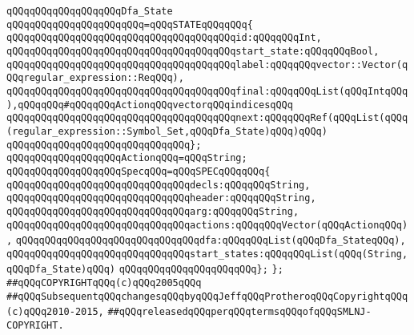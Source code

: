 \verb|qQQqqQQqqQQqqQQqqQQqDfa_State|\newline
\verb|qQQqqQQqqQQqqQQqqQQqqQQq=qQQqSTATEqQQqqQQq{|\newline
\verb|qQQqqQQqqQQqqQQqqQQqqQQqqQQqqQQqqQQqqQQqid:qQQqqQQqInt,|\newline
\verb|qQQqqQQqqQQqqQQqqQQqqQQqqQQqqQQqqQQqqQQqstart_state:qQQqqQQqBool,|\newline
\verb|qQQqqQQqqQQqqQQqqQQqqQQqqQQqqQQqqQQqqQQqlabel:qQQqqQQqvector::Vector(qQQqregular_expression::ReqQQq),|\newline
\verb|qQQqqQQqqQQqqQQqqQQqqQQqqQQqqQQqqQQqqQQqfinal:qQQqqQQqList(qQQqIntqQQq),qQQqqQQq#qQQqqQQqActionqQQqvectorqQQqindicesqQQq|\newline
\verb|qQQqqQQqqQQqqQQqqQQqqQQqqQQqqQQqqQQqqQQqnext:qQQqqQQqRef(qQQqList(qQQq(regular_expression::Symbol_Set,qQQqDfa_State)qQQq)qQQq)|\newline
\verb|qQQqqQQqqQQqqQQqqQQqqQQqqQQqqQQq};|\newline
\newline
\verb|qQQqqQQqqQQqqQQqqQQqActionqQQq=qQQqString;|\newline
\newline
\verb|qQQqqQQqqQQqqQQqqQQqSpecqQQq=qQQqSPECqQQqqQQq{|\newline
\verb|qQQqqQQqqQQqqQQqqQQqqQQqqQQqqQQqdecls:qQQqqQQqString,|\newline
\verb|qQQqqQQqqQQqqQQqqQQqqQQqqQQqqQQqheader:qQQqqQQqString,|\newline
\verb|qQQqqQQqqQQqqQQqqQQqqQQqqQQqqQQqarg:qQQqqQQqString,|\newline
\verb|qQQqqQQqqQQqqQQqqQQqqQQqqQQqqQQqactions:qQQqqQQqVector(qQQqActionqQQq),|\newline
\verb|qQQqqQQqqQQqqQQqqQQqqQQqqQQqqQQqdfa:qQQqqQQqList(qQQqDfa_StateqQQq),|\newline
\verb|qQQqqQQqqQQqqQQqqQQqqQQqqQQqqQQqstart_states:qQQqqQQqList(qQQq(String,qQQqDfa_State)qQQq)|\newline
\verb|qQQqqQQqqQQqqQQqqQQqqQQq};|\newline
\newline
\verb|};|\newline
\newline
\newline
\verb|##qQQqCOPYRIGHTqQQq(c)qQQq2005qQQq|\newline
\verb|##qQQqSubsequentqQQqchangesqQQqbyqQQqJeffqQQqProtheroqQQqCopyrightqQQq(c)qQQq2010-2015,|\newline
\verb|##qQQqreleasedqQQqperqQQqtermsqQQqofqQQqSMLNJ-COPYRIGHT.|\newline

